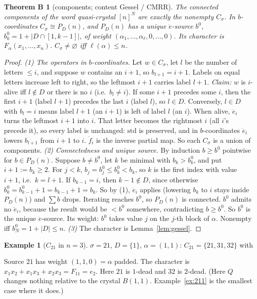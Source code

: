 \documentclass[11pt]{amsart}
\newtheorem*{theoremB}{Theorem B}
\theoremstyle{definition}
\newtheorem{example}[theorem]{Example}
\theoremstyle{remark}
\newcommand{\ee}{\ddot e}
\newcommand{\ff}{\ddot f}
\newcommand{\std}{\mathrm{std}}
\begin{document}
\begin{theoremB}[components; content Gessel / CMRR]
The connected components of the word quasi-crystal $[n]^N$ are exactly the nonempty $C_\sigma$. In $b$-coordinates $C_\sigma\cong P_D(n)$, and $P_D(n)$ has a unique $\ee$-source $b^0$, $b^0_k=1+|D\cap[1,k-1]|$, of weight $(\alpha_1,\dots,\alpha_\ell,0,\dots,0)$. Its character is $F_\alpha(x_1,\dots,x_n)$. $C_\sigma\ne\varnothing$ iff $\ell(\alpha)\le n$.
\end{theoremB}
\begin{proof}
\emph{(1) The operators in $b$-coordinates.} Let $w\in C_\sigma$, let $l$ be the number of letters $\le i$, and suppose $w$ contains an $i+1$, so $b_{l+1}=i+1$. Labels on equal letters increase left to right, so the leftmost $i+1$ carries label $l+1$. \emph{Claim:} $w$ is $i$-alive iff $l\notin D$ or there is no $i$ (i.e.\ $b_l\ne i$). If some $i+1$ precedes some $i$, then the first $i+1$ (label $l+1$) precedes the last $i$ (label $l$), so $l\in D$. Conversely, $l\in D$ with $b_l=i$ means label $l+1$ (an $i+1$) is left of label $l$ (an $i$). When alive, $\ee_i$ turns the leftmost $i+1$ into $i$. That letter becomes the rightmost $i$ (all $i$'s precede it), so every label is unchanged: $\std$ is preserved, and in $b$-coordinates $\ee_i$ lowers $b_{l+1}$ from $i+1$ to $i$. $\ff_i$ is the inverse partial map. So each $C_\sigma$ is a union of components.
\emph{(2) Connectedness and unique source.} By induction $b\ge b^0$ pointwise for $b\in P_D(n)$. Suppose $b\ne b^0$, let $k$ be minimal with $b_k>b^0_k$, and put $i+1:=b_k\ge2$. For $j<k$, $b_j=b^0_j\le b^0_k<b_k$, so $k$ is the first index with value $i+1$, i.e.\ $k=l+1$. If $b_{k-1}=i$, then $k-1\notin D$, since otherwise $b^0_k=b^0_{k-1}+1=b_{k-1}+1=b_k$. So by (1), $\ee_i$ applies (lowering $b_k$ to $i$ stays inside $P_D(n)$) and $\sum b$ drops. Iterating reaches $b^0$, so $P_D(n)$ is connected. $b^0$ admits no $\ee_i$, because the result would be $<b^0$ somewhere, contradicting $b\ge b^0$. So $b^0$ is the unique $\ee$-source. Its weight: $b^0$ takes value $j$ on the $j$-th block of $\alpha$. Nonempty iff $b^0_N=1+|D|\le n$.
\emph{(3)} The character is Lemma~\ref{lem:gessel}.
\end{proof}

\begin{example}[$C_{21}$ in $n=3$]
$\sigma=21$, $D=\{1\}$, $\alpha=(1,1)$: $C_{21}=\{21,31,32\}$ with
\begin{center}
\end{center}
Source $21$ has weight $(1,1,0)=\alpha$ padded. The character is $x_1x_2+x_1x_3+x_2x_3=F_{11}=e_2$. Here $21$ is $1$-dead and $32$ is $2$-dead. (Here $Q$ changes nothing relative to the crystal $B(1,1)$. Example~\ref{ex:211} is the smallest case where it does.)
\end{example}
\end{document}
